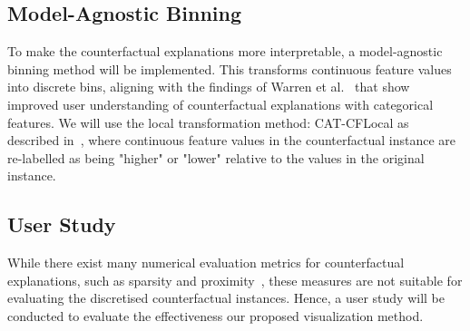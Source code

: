 \subsection*{Model-Agnostic Binning}
To make the counterfactual explanations more interpretable, a model-agnostic binning method will be implemented. This transforms continuous feature values into discrete bins, aligning with the findings of Warren et al.~\cite{warren_et_al_user_study_2023} that show improved user understanding of counterfactual explanations with categorical features. We will use the local transformation method: CAT-CFLocal as described in~\cite{warren2022better}, where continuous feature values in the counterfactual instance are re-labelled as being "higher" or "lower" relative to the values in the original instance. 


\subsection*{User Study}
While there exist many numerical evaluation metrics for counterfactual explanations, such as sparsity and proximity~\cite{keane2020good}, these measures are not suitable for evaluating the discretised counterfactual instances. Hence, a user study will be conducted to evaluate the effectiveness our proposed visualization method.


